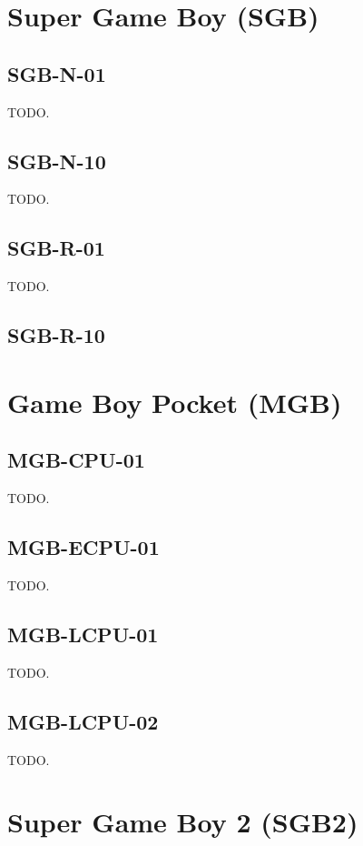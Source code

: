 \section{Super Game Boy (SGB)}

\subsection{SGB-N-01}

TODO.

\subsection{SGB-N-10}

TODO.

\subsection{SGB-R-01}

TODO.

\subsection{SGB-R-10}

\section{Game Boy Pocket (MGB)}

\subsection{MGB-CPU-01}

TODO.

\subsection{MGB-ECPU-01}

TODO.

\subsection{MGB-LCPU-01}

TODO.

\subsection{MGB-LCPU-02}

TODO.

\section{Super Game Boy 2 (SGB2)}

